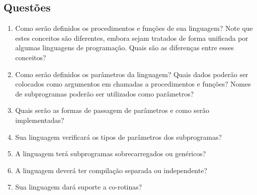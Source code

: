 \documentclass[12pt, a4paper]{article}
\begin{document}
        \subsection{Questões}
        \begin{enumerate}
            \item
            Como serão definidos os procedimentos e funções de sua linguagem?
            Note que estes conceitos são diferentes, embora sejam tratados de
            forma unificada por algumas linguagens de programação. Quais são as
            diferenças entre esses conceitos?

            \item
            Como serão definidos os parâmetros da linguagem? Quais dados
            poderão ser colocados como argumentos em chamadas a procedimentos e
            funções? Nomes de subprogramas poderão ser utilizados como
            parâmetros?

            \item
            Quais serão as formas de passagem de parâmetros e como serão
            implementadas?

            \item
            Sua linguagem verificará os tipos de parâmetros dos subprogramas?

            \item
            A linguagem terá subprogramas sobrecarregados ou genéricos?

            \item
            A linguagem deverá ter compilação separada ou independente?

            \item
            Sua linguagem dará suporte a co-rotinas?
        \end{enumerate}
\end{document}
